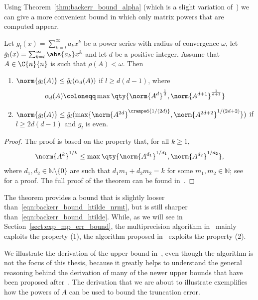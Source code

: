 Using Theorem~\ref{thm:backerr_bound_alpha} (which is a slight variation of~\cite[Thm.~4.2]{higham:alhi09_new}) we can give a more convenient bound in which only matrix powers that are computed appear.
\begin{teorema}\label{thm:backerr_bound_alpha}
	Let $g_l(x)=\sum_{k=l}^{\infty}a_kx^k$ be a power series with radius of convergence $\omega$, let $\tilde{g}_l(x)=\sum_{k=l}^{\infty}\abs{a_k}x^k$ and let $d$ be a positive integer. Assume that $A\in\C{n}{n}$ is such that $\rho(A)<\omega$. Then
	\begin{enumerate}
		\item $\norm{g_l(A)}\le\tilde{g}_l(\alpha_d(A))$ if $l\ge d(d-1)$, where
			\begin{equation}\label{eqn:alpha_d_def}
				\alpha_d(A)\coloneqq\max\qty{\norm{A^d}^{\frac{1}{d}}, \norm{A^{d+1}}^{\frac{1}{d+1}}}
			\end{equation}
		\item $\norm{g_l(A)}\le\tilde{g}_l(\max\{\norm{A^{2d}}^{\cramped{1/(2d)}}, \norm{A^{2d+2}}^{1/(2d+2)}\})$ if $l\ge 2d(d-1)$ and $g_l$ is even.
	\end{enumerate}
\end{teorema}
\begin{proof}
	The proof is based on the property that, for all $k\ge 1$, 
	\[
		\norm{A^k}^{1/k}\le\max\qty{\norm{A^{d_1}}^{1/d_1}, \norm{A^{d_2}}^{1/d_2}},
	\] 
	where $d_1,d_2\in\mathbb{N}\setminus\{0\}$ are such that $d_1m_1+d_2m_2=k$ for some $m_1,m_2\in\mathbb{N}$; see~\cite[Lemma~4.1]{higham:alhi09_new} for a proof. The full proof of the theorem can be found in~\cite{higham:alhi09_new}.
\end{proof}
The theorem provides a bound that is slightly looser than~\eqref{eqn:backerr_bound_htilde_nrmt}, but is still sharper than~\eqref{eqn:backerr_bound_htilde}. While, as we will see in Section~\ref{sect:exp_mp_err_bound}, the multiprecision algorithm in~\cite{higham:hf19_mpexpm} mainly exploits the property (1), the algorithm proposed in~\cite{higham:alhi09_new} exploits the property (2). 

We illustrate the derivation of the upper bound in~\cite{higham:alhi09_new}, even though the algorithm is not the focus of this thesis, because it greatly helps to understand the general reasoning behind the derivation of many of the newer upper bounds that have been proposed after~\cite{higham:SaS_revisited}. The derivation that we are about to illustrate exemplifies how the powers of $A$ can be used to bound the truncation error.


